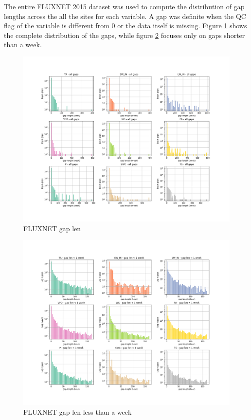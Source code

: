 \documentclass{article}
\newcommand{\imgwidth}{6in}
\begin{document}
The entire FLUXNET 2015 dataset was used to compute the distribution of gap lengths across the all the sites for each variable. A gap was definite when the QC flag of the variable is different from 0 or the data itself is missing. Figure \ref{fig:gap_len_dist} shows the complete distribution of the gaps, while figure \ref{fig:gap_len_dist_small} focuses only on gaps shorter than a week.


\begin{figure}
\centerline{\includegraphics[width=\imgwidth]{gap_len_dist}}
\caption{FLUXNET gap len}
\label{fig:gap_len_dist}
\end{figure}
\begin{figure}
\centerline{\includegraphics[width=\imgwidth]{gap_len_dist_small}}
\caption{FLUXNET gap len less than a week}
\label{fig:gap_len_dist_small}
\end{figure}
\end{document}
